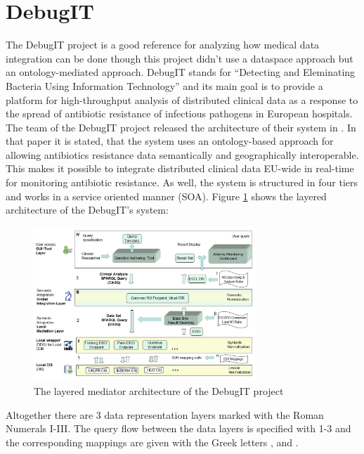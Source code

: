 \section{DebugIT}
The DebugIT project is a good reference for analyzing how medical data integration can be done though this project didn't use a dataspace approach but an ontology-mediated \cite{WurstDiss, DBLP:books/dp/LeserN2006} approach. DebugIT stands for ``Detecting and Eleminating Bacteria Using Information Technology'' and its main goal is to provide a platform for high-throughput analysis of distributed clinical data as a response to the spread of antibiotic resistance of infectious pathogens in European hospitals\cite{UniFreiburgDebugITInfo}. 
The team of the DebugIT project released the architecture of their system in \cite{DBLP:conf/swat4ls/SchoberCDEDJTPLB14}.
In that paper it is stated, that the system uses an ontology-based approach for allowing antibiotics resistance data semantically and geographically interoperable. This makes it possible to integrate distributed clinical data EU-wide in real-time for monitoring antibiotic resistance. As well, the system is structured in four tiers and works in a service oriented manner (SOA). Figure \ref{DebugITArchitectureFigure} shows the layered architecture of the DebugIT's system:
\begin{figure}[H]
	\begin{center}
		\includegraphics[width=0.75\textwidth]{figures/DebugIT-Ontology-mediated-layered-Data-Integration-architecture.png}
	\end{center}
	\caption{The layered mediator architecture of the DebugIT project}
	\label{DebugITArchitectureFigure}
\end{figure}

Altogether there are 3 data representation layers marked with the Roman Numerals I-III. The query flow between the data layers is specified with 1-3 and the corresponding mappings are given with the Greek letters \textalpha , \textbeta  and \textgamma .

